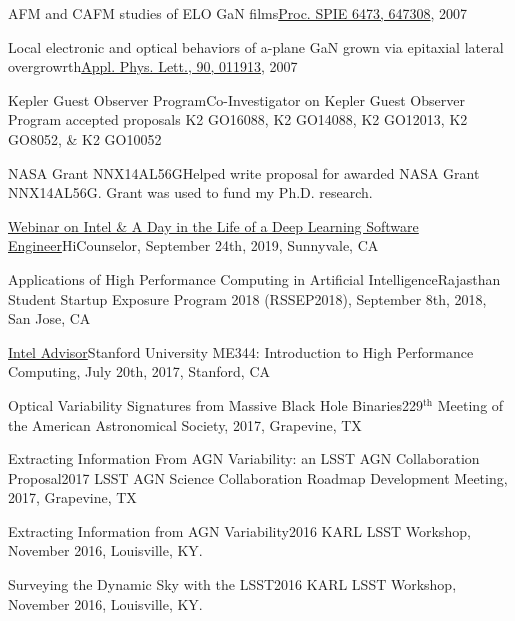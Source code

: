 \documentclass[10pt,a4paper]{article}
\begin{document}
\inlineheadsection
  {AFM and CAFM studies of ELO GaN films}{\href{http://dx.doi.org/10.1117/12.706773}{Proc. SPIE 6473, 647308}, 2007}

\inlineheadsection
  {Local electronic and optical behaviors of a-plane GaN grown via epitaxial lateral overgrowrth}{\href{http://dx.doi.org/10.1063/1.2429901}{Appl. Phys. Lett., 90, 011913}, 2007}


\spacedhrule{2.0em}{0.2em}


\inlineheadsection
  {Kepler Guest Observer Program}{Co-Investigator on Kepler Guest Observer Program accepted proposals K2 GO16088, K2 GO14088, K2 GO12013, K2 GO8052, \& K2 GO10052}

\inlineheadsection
  {NASA Grant NNX14AL56G}{Helped write proposal for awarded NASA Grant NNX14AL56G. Grant was used to fund my Ph.D. research.}

\spacedhrule{2.0em}{0.2em}


\inlineheadsection
  {\href{https://www.youtube.com/watch?v=lVLn9am93Qs}{Webinar on Intel \& A Day in the Life of a Deep Learning Software Engineer}}{HiCounselor, September 24th, 2019, Sunnyvale, CA}

\inlineheadsection
  {Applications of High Performance Computing in Artificial Intelligence}{Rajasthan Student Startup Exposure Program 2018 (RSSEP2018), September 8th, 2018, San Jose, CA}

\inlineheadsection
  {\href{https://software.intel.com/en-us/advisor}{Intel Advisor}}{Stanford University ME344: Introduction to High Performance Computing, July 20th, 2017, Stanford, CA}

\inlineheadsection
  {Optical Variability Signatures from Massive Black Hole Binaries}{229$^{\mathrm{th}}$ Meeting of the American Astronomical Society, 2017, Grapevine, TX}

\inlineheadsection
  {Extracting Information From AGN Variability: an LSST AGN Collaboration Proposal}{2017 LSST AGN Science Collaboration Roadmap Development Meeting, 2017, Grapevine, TX}

\inlineheadsection
  {Extracting Information from AGN Variability}{2016 KARL LSST Workshop, November 2016, Louisville, KY.}

\inlineheadsection
  {Surveying the Dynamic Sky with the LSST}{2016 KARL LSST Workshop, November 2016, Louisville, KY.}
\end{document}
